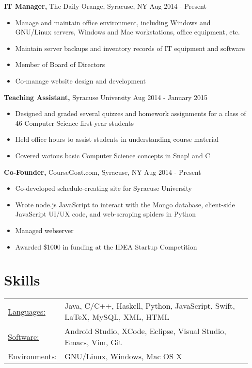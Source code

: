 \documentclass[margin]{res}
\begin{document}
\begin{resume}
{\bf IT Manager,} The Daily Orange, Syracuse, NY \hfill  Aug 2014 - Present
\begin{itemize} \itemsep -2pt %
\item Manage and maintain office environment, including Windows and GNU/Linux servers, Windows and Mac workstations, office equipment, etc.
\item Maintain server backups and inventory records of IT equipment and software
\item Member of Board of Directors
\item Co-manage website design and development
\end{itemize}

{\bf Teaching Assistant,} Syracuse University \hfill  Aug 2014 - January 2015
\begin{itemize} \itemsep -2pt %
\item Designed and graded several quizzes and homework assignments for a class of 46 Computer Science first-year students
\item Held office hours to assist students in understanding course material
\item Covered various basic Computer Science concepts in Snap! and C
\end{itemize}

{\bf Co-Founder,} CourseGoat.com, Syracuse, NY \hfill
Aug 2014 - Present            
\begin{itemize} \itemsep -2pt
\item  Co-developed schedule-creating site for Syracuse University
\item Wrote node.js JavaScript to interact with the Mongo database, client-side JavaScript UI/UX code, and web-scraping spiders in Python
\item Managed webserver
\item Awarded \$1000 in funding at the IDEA Startup Competition
\end{itemize}




 

\section{Skills}
   \begin{tabular}{l p{3in}}
    \underline{Languages:} & Java, C/C++, Haskell, Python, JavaScript, Swift, \LaTeX , MySQL, XML, HTML \\
     \underline{Software:} & Android Studio, XCode, Eclipse, Visual Studio, Emacs, Vim, Git  \\
     \underline{Environments:} & GNU/Linux, Windows, Mac OS X
     

\end{tabular}
\end{resume}
\end{document}
